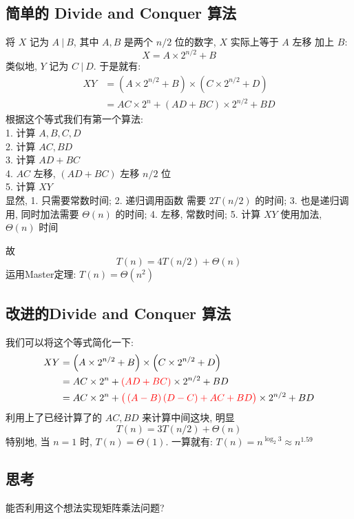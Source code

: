 \documentclass[a4paper, 10pt]{ctexart} %
\begin{document}
\subsection{简单的 Divide and Conquer 算法}
将 $X$ 记为 $A\ |\ B$, 其中 $A, B$ 是两个 $n / 2$ 位的数字, 
$X$ 实际上等于 $A$ 左移 加上 $B$:
\[
X = A \times 2 ^{n /2} + B 
\]
类似地, $Y$ 记为 $C\ | \ D$. 于是就有:
\[
\begin{aligned}
XY &= \left(A \times 2^{n /2} + B\right) \times 
\left( C \times 2^{n /2} +D  \right)\\
& = AC \times 2 ^{n} + \left(AD + BC\right) \times 2^{n /2} + BD
\end{aligned}
\]
根据这个等式我们有第一个算法:\\
1. 计算 $A,B,C,D$\\
2. 计算 $AC, BD$\\
3. 计算 $AD + BC$\\
4. $AC$ 左移, $\left(AD + BC\right)$ 左移 $n / 2$ 位\\
5. 计算 $XY$\\
显然, 1. 只需要常数时间; 2. 递归调用函数 需要 $2T(n /2)$ 的时间; 3. 也是递归调用, 
同时加法需要 $\Theta \left(n\right)$ 的时间;
4. 左移, 常数时间;
5. 计算 $XY$ 使用加法, $\Theta \left(n\right)$ 时间

故
\[
T\left(n\right) = 4 T\left( n / 2\right) + \Theta \left(n\right)
\]
运用Master定理: $T\left( n\right) = \Theta \left(n ^{2}\right)$

\subsection{改进的Divide and Conquer 算法}
我们可以将这个等式简化一下:
\[
\begin{aligned}
XY &= \left(A \times 2^{n /2} + B\right) \times 
\left( C \times 2^{n /2} +D  \right)\\
& = AC \times 2 ^{n} + {\color{red}\left(AD + BC\right)}\times 2^{n /2} + BD\\
& = AC \times 2 ^{n} + {\color{red} \big(\left(A- B\right) \left(D -C\right)
+AC +BD\big)}  \times 2 ^{ n  /2} +BD
\end{aligned}
\]
利用上了已经计算了的 $AC, BD$ 来计算中间这块, 明显
\[
T\left(n\right) = 3 T\left( n / 2\right) + \Theta \left(n\right)
\]
特别地, 当 $n=1$ 时, $ T\left(n\right) = \Theta \left(1\right)$. 
一算就有: $T\left(n\right)= n ^{\log _{2} 3 } \approx n ^{ 1.59}$

\subsection{思考} 能否利用这个想法实现矩阵乘法问题?
\end{document}
